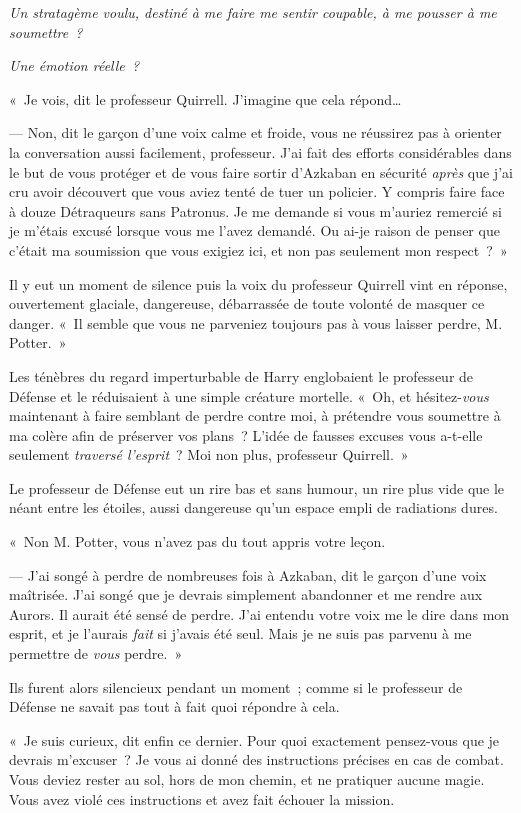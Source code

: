 \emph{Un stratagème voulu, destiné à me faire me sentir coupable, à me pousser à me soumettre~?}

\emph{Une émotion réelle~?}

«~Je vois, dit le professeur Quirrell. J'imagine que cela répond…

--- Non, dit le garçon d'une voix calme et froide, vous ne réussirez pas à orienter la conversation aussi facilement, professeur. J'ai fait des efforts considérables dans le but de vous protéger et de vous faire sortir d'Azkaban en sécurité \emph{après} que j'ai cru avoir découvert que vous aviez tenté de tuer un policier. Y compris faire face à douze Détraqueurs sans Patronus. Je me demande si vous m'auriez remercié si je m'étais excusé lorsque vous me l'avez demandé. Ou ai-je raison de penser que c'était ma soumission que vous exigiez ici, et non pas seulement mon respect~?~»

Il y eut un moment de silence puis la voix du professeur Quirrell vint en réponse, ouvertement glaciale, dangereuse, débarrassée de toute volonté de masquer ce danger. «~Il semble que vous ne parveniez toujours pas à vous laisser perdre, M. Potter.~»

Les ténèbres du regard imperturbable de Harry englobaient le professeur de Défense et le réduisaient à une simple créature mortelle. «~Oh, et hésitez-\emph{vous} maintenant à faire semblant de perdre contre moi, à prétendre vous soumettre à ma colère afin de préserver vos plans~? L'idée de fausses excuses vous a-t-elle seulement \emph{traversé l'esprit}~? Moi non plus, professeur Quirrell.~»

Le professeur de Défense eut un rire bas et sans humour, un rire plus vide que le néant entre les étoiles, aussi dangereuse qu'un espace empli de radiations dures.

«~Non M. Potter, vous n'avez pas du tout appris votre leçon.

--- J'ai songé à perdre de nombreuses fois à Azkaban, dit le garçon d'une voix maîtrisée. J'ai songé que je devrais simplement abandonner et me rendre aux Aurors. Il aurait été sensé de perdre. J'ai entendu votre voix me le dire dans mon esprit, et je l'aurais \emph{fait} si j'avais été seul. Mais je ne suis pas parvenu à me permettre de \emph{vous} perdre.~»

Ils furent alors silencieux pendant un moment~; comme si le professeur de Défense ne savait pas tout à fait quoi répondre à cela.

«~Je suis curieux, dit enfin ce dernier. Pour quoi exactement pensez-vous que je devrais m'excuser~? Je vous ai donné des instructions précises en cas de combat. Vous deviez rester au sol, hors de mon chemin, et ne pratiquer aucune magie. Vous avez violé ces instructions et avez fait échouer la mission.

